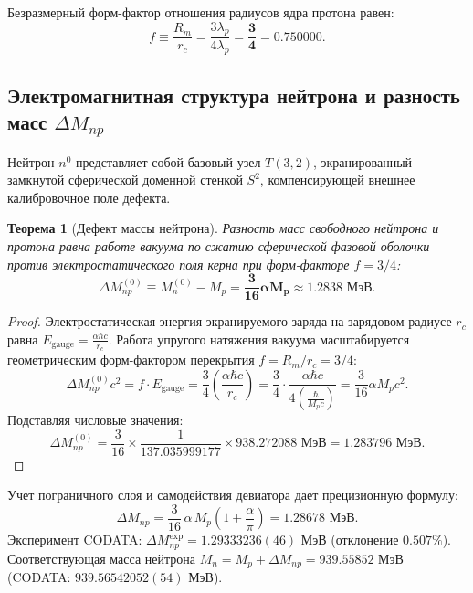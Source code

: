 \documentclass[11pt,a4paper]{article}
\newtheorem{theorem}{Теорема}[section]
\theoremstyle{definition}
\theoremstyle{remark}
\begin{document}
Безразмерный форм-фактор отношения радиусов ядра протона равен:
\begin{equation}
    f \equiv \frac{R_m}{r_c} = \frac{3\lambda_p}{4\lambda_p} = \boldsymbol{\frac{3}{4}} = 0.750000.
    \label{eq:radius_ratio}
\end{equation}

\subsection{Электромагнитная структура нейтрона и разность масс $\Delta M_{np}$}
Нейтрон $n^0$ представляет собой базовый узел $T(3,2)$, экранированный замкнутой сферической доменной стенкой $S^2$, компенсирующей внешнее калибровочное поле дефекта.

\begin{theorem}[Дефект массы нейтрона]
Разность масс свободного нейтрона и протона равна работе вакуума по сжатию сферической фазовой оболочки против электростатического поля керна при форм-факторе $f = 3/4$:
\begin{equation}
    \Delta M_{np}^{(0)} \equiv M_n^{(0)} - M_p = \boldsymbol{\frac{3}{16}\alpha M_p} \approx \mathbf{1.2838\text{ МэВ}}.
    \label{eq:delta_mnp_tree}
\end{equation}
\end{theorem}

\begin{proof}
Электростатическая энергия экранируемого заряда на зарядовом радиусе $r_c$ равна $E_{\mathrm{gauge}} = \frac{\alpha \hbar c}{r_c}$. Работа упругого натяжения вакуума масштабируется геометрическим форм-фактором перекрытия $f = R_m / r_c = 3/4$:
\begin{equation}
    \Delta M_{np}^{(0)} c^2 = f \cdot E_{\mathrm{gauge}} = \frac{3}{4} \left( \frac{\alpha \hbar c}{r_c} \right) = \frac{3}{4} \cdot \frac{\alpha \hbar c}{4 \left( \frac{\hbar}{M_p c} \right)} = \frac{3}{16}\alpha M_p c^2.
\end{equation}
Подставляя числовые значения:
\begin{equation}
    \Delta M_{np}^{(0)} = \frac{3}{16} \times \frac{1}{137.035999177} \times 938.272088\text{ МэВ} = 1.283796\text{ МэВ}.
\end{equation}
\end{proof}

Учет пограничного слоя и самодействия девиатора дает прецизионную формулу:
\begin{equation}
    \Delta M_{np} = \frac{3}{16}\,\alpha\,M_p\left(1 + \frac{\alpha}{\pi}\right) = \mathbf{1.28678\text{ МэВ}}.
    \label{eq:delta_mnp_full}
\end{equation}
Эксперимент CODATA: $\Delta M_{np}^{\mathrm{exp}} = 1.29333236(46)$ МэВ (отклонение $0.507\%$). Соответствующая масса нейтрона $M_n = M_p + \Delta M_{np} = 939.55852$ МэВ (CODATA: $939.56542052(54)$ МэВ).
\end{document}
